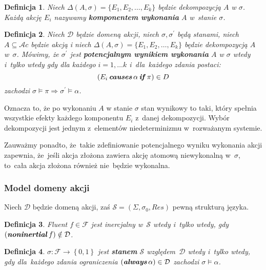 \documentclass[11pt,a4paper]{article}
\newtheorem{defn}{Definicja}
\DeclareMathOperator{\Causes}{\textbf{\textit{causes}}}
\DeclareMathOperator{\If}{\textbf{\textit{if}}}
\DeclareMathOperator{\Always}{\textbf{\textit{always}}}
\DeclareMathOperator{\Noninertial}{\textbf{\textit{noninertial}}}
\begin{document}
\begin{defn}
    Niech $\Delta(A, \sigma) = \{ E_1, E_2, \dots, E_k \}$ będzie dekompozycją $A$ w $\sigma$. Każdą akcję $E_i$ nazywamy \textbf{komponentem wykonania} $A$ w~stanie $\sigma$.
\end{defn}
    
\begin{defn}
    Niech $\mathcal{D}$ będzie domeną akcji, niech $\sigma, \sigma^\prime$ będą stanami, niech $A \subseteq \mathcal{A}c$ będzie akcją i niech $\Delta(A, \sigma) = \{ E_1, E_2, \dots, E_k \}$ będzie dekompozycją $A$ w~$\sigma$.
    Mówimy, że $\sigma^\prime$ jest \textbf{potencjalnym wynikiem wykonania} $A$ w $\sigma$ wtedy i~tylko wtedy gdy dla każdego $i = 1, \dots k$ i~dla~każdego zdania postaci: 
    $$ (E_i \Causes \alpha \If \pi) \in D $$
    zachodzi $\sigma \models \pi \Rightarrow \sigma^\prime \models \alpha $.
\end{defn} 
    
Oznacza to, że po wykonaniu $A$ w stanie $\sigma$ stan wynikowy to taki, który spełnia wszystkie efekty każdego komponentu $E_i$ z~danej dekompozycji.
Wybór dekompozycji jest jednym z~elementów niedeterminizmu w~rozważanym systemie.

Zauważmy ponadto, że~takie zdefiniowanie potencjalnego wyniku wykonania akcji zapewnia, że~jeśli akcja złożona zawiera akcję atomową niewykonalną w~$\sigma$, to~cała akcja złożona również nie~będzie wykonalna.

\subsubsection{Model domeny akcji}

Niech $\mathcal{D}$ będzie domeną akcji, zaś $\mathcal{S} = \left(\Sigma, \sigma_0, Res\right)$ pewną strukturą języka.

\begin{defn}
    Fluent $f \in \mathcal{F}$ jest inercjalny w~$\mathcal{S}$ wtedy i~tylko wtedy, gdy $\left(\Noninertial f\right) \notin \mathcal{D}$.
\end{defn}

\begin{defn}
    $\sigma : \mathcal{F} \rightarrow \left\{0,1\right\}$ jest \textbf{stanem} $\mathcal{S}$ względem~$\mathcal{D}$ wtedy i~tylko wtedy, gdy dla~każdego zdania ograniczenia $\left(\Always \alpha\right) \in \mathcal{D}$ zachodzi $\sigma \models \alpha$.
\end{defn}
\end{document}
